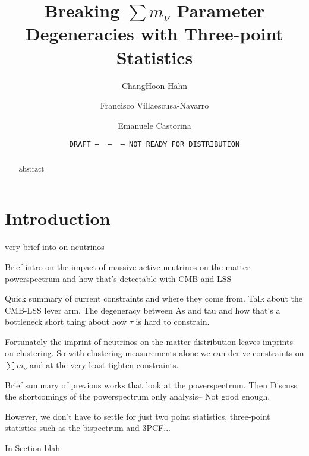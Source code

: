 \documentclass[12pt, letterpaper, preprint]{aastex62}
\newcommand{\smnu}{\sum m_\nu}
\begin{document}
\sloppy\sloppypar\frenchspacing 

\title{Breaking $\smnu$ Parameter Degeneracies with Three-point Statistics} 
\date{\texttt{DRAFT~---~\githash~---~\gitdate~---~NOT READY FOR DISTRIBUTION}}

\author{ChangHoon Hahn}

\author{Francisco Villaescusa-Navarro} 

\author{Emanuele Castorina} 

\begin{abstract}
    abstract
\end{abstract}


\section{Introduction}
very brief into on neutrinos

Brief intro on the impact of massive active neutrinos on the matter powerspectrum 
and how that's detectable with CMB and LSS


Quick summary of current constraints and where they come from. Talk about the 
CMB-LSS lever arm. The degeneracy between As and tau and how that's a bottleneck
short thing about how $\tau$ is hard to constrain.

Fortunately the imprint of neutrinos on the matter distribution leaves imprints
on clustering. So with clustering measurements alone we can derive constraints 
on $\smnu$ and at the very least tighten constraints.  

Brief summary of previous works that look at the powerspectrum. Then Discuss the 
shortcomings of the powerspectrum only analysis-- Not good enough. 

However, we don't have to settle for just two point statistics, three-point 
statistics such as the bispectrum and 3PCF... 

In Section blah 
\end{document}
